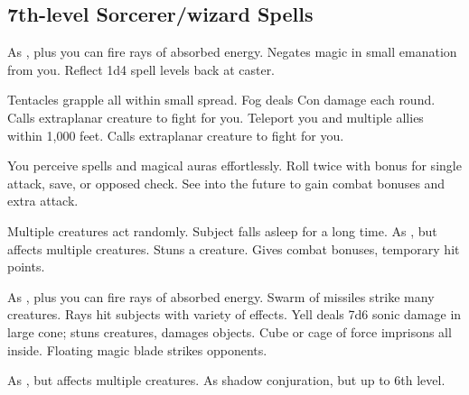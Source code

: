 \subsection{7th-level Sorcerer/wizard Spells}
\begin{swspelllist}
   As , plus you can fire rays of absorbed energy.
  \spellhead{}
   Negates magic in small emanation from you.
   Reflect 1d4 spell levels back at caster.

   Tentacles grapple all within small spread.
   Fog deals Con damage each round.
   Calls extraplanar creature to fight for you.
   Teleport you and multiple allies within 1,000 feet.
   Calls extraplanar creature to fight for you.

   You perceive spells and magical auras effortlessly.
   Roll twice with bonus for single attack, save, or opposed check.
  \spellheadrestricted{}
   See into the future to gain combat bonuses and extra attack.

   Multiple creatures act randomly.
   Subject falls asleep for a long time.
   As , but affects multiple creatures.
   Stuns a creature.
   Gives combat bonuses, temporary hit points.
  \spellheadrestricted{}

   As , plus you can fire rays of absorbed energy.
   Swarm of missiles strike many creatures.
   Rays hit subjects with variety of effects.
   Yell deals 7d6 sonic damage in large cone; stuns creatures, damages objects.
  \M Cube or cage of force imprisons all inside.
  \F Floating magic blade strikes opponents.

   As , but affects multiple creatures.
  \spellheadrestricted{}
   As shadow conjuration, but up to 6th level.


\end{swspelllist}
